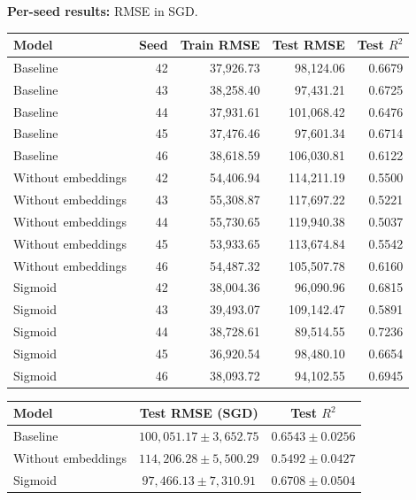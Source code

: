 \documentclass[10pt,a4paper]{article}
\begin{document}
\textbf{Per-seed results:} RMSE in SGD.
\begin{center}\small\begin{tabular}{lrrrr}\toprule Model & Seed & Train RMSE & Test RMSE & Test $R^2$\\\midrule
Baseline & 42 & 37,926.73 & 98,124.06 & 0.6679 \\
Baseline & 43 & 38,258.40 & 97,431.21 & 0.6725 \\
Baseline & 44 & 37,931.61 & 101,068.42 & 0.6476 \\
Baseline & 45 & 37,476.46 & 97,601.34 & 0.6714 \\
Baseline & 46 & 38,618.59 & 106,030.81 & 0.6122 \\
Without embeddings & 42 & 54,406.94 & 114,211.19 & 0.5500 \\
Without embeddings & 43 & 55,308.87 & 117,697.22 & 0.5221 \\
Without embeddings & 44 & 55,730.65 & 119,940.38 & 0.5037 \\
Without embeddings & 45 & 53,933.65 & 113,674.84 & 0.5542 \\
Without embeddings & 46 & 54,487.32 & 105,507.78 & 0.6160 \\
Sigmoid & 42 & 38,004.36 & 96,090.96 & 0.6815 \\
Sigmoid & 43 & 39,493.07 & 109,142.47 & 0.5891 \\
Sigmoid & 44 & 38,728.61 & 89,514.55 & 0.7236 \\
Sigmoid & 45 & 36,920.54 & 98,480.10 & 0.6654 \\
Sigmoid & 46 & 38,093.72 & 94,102.55 & 0.6945 \\
\bottomrule\end{tabular}\end{center}
\begin{center}\small\begin{tabular}{lcc}\toprule Model & Test RMSE (SGD) & Test $R^2$ \\ \midrule
Baseline & $100,051.17\pm 3,652.75$ & $0.6543\pm 0.0256$ \\
Without embeddings & $114,206.28\pm 5,500.29$ & $0.5492\pm 0.0427$ \\
Sigmoid & $97,466.13\pm 7,310.91$ & $0.6708\pm 0.0504$ \\
\bottomrule\end{tabular}\end{center}
\end{document}
